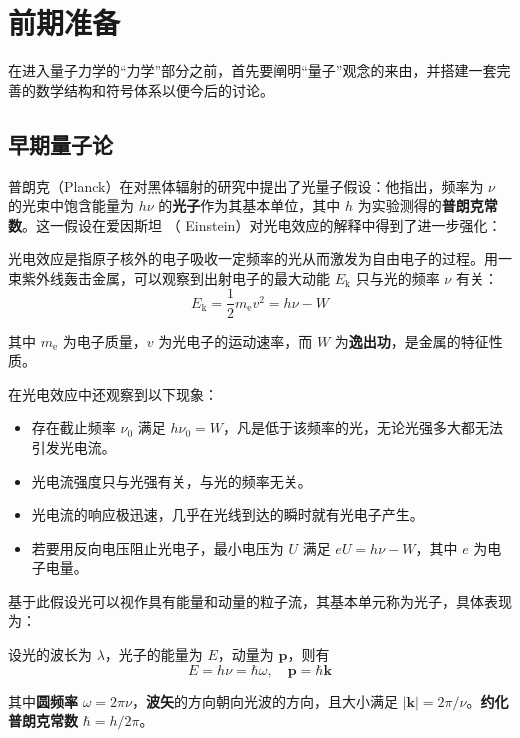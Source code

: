 \documentclass[cn,10pt,math=newtx,citestyle=gb7714-2015,bibstyle=gb7714-2015]{elegantbook}
\def\bm{\boldsymbol}
\def\bf{\textbf}
\def\e{\mathrm e}
\begin{document}
\section{前期准备}

在进入量子力学的“力学”部分之前，首先要阐明“量子”观念的来由，并搭建一套完善的数学结构和符号体系以便今后的讨论。

\subsection{早期量子论}

普朗克（Planck）在对黑体辐射的研究中提出了光量子假设：他指出，频率为 $\nu$ 的光束中饱含能量为 $h\nu$ 的\textbf{光子}作为其基本单位，其中 $h$ 为实验测得的\textbf{普朗克常数}。这一假设在爱因斯坦 （ Einstein）对光电效应的解释中得到了进一步强化：

\begin{definition}[光电效应]\label{def:elecphoto} 

光电效应是指原子核外的电子吸收一定频率的光从而激发为自由电子的过程。用一束紫外线轰击金属，可以观察到出射电子的最大动能 $E_\mathrm{k}$ 只与光的频率 $\nu$ 有关：
\begin{equation}
   \label{a}
   E_\mathrm{k} = \frac 1 2 m_\e v^2 = h\nu - W
\end{equation}

其中 $m_\e$ 为电子质量，$v$ 为光电子的运动速率，而 $W$ 为\textbf{逸出功}，是金属的特征性质。
\end{definition}

在光电效应中还观察到以下现象：

\begin{itemize}
   \item 存在截止频率 $\nu_0$ 满足 $h\nu_0=W$，凡是低于该频率的光，无论光强多大都无法引发光电流。
   \item 光电流强度只与光强有关，与光的频率无关。
   \item 光电流的响应极迅速，几乎在光线到达的瞬时就有光电子产生。
   \item 若要用反向电压阻止光电子，最小电压为 $U$ 满足 $eU=h\nu-W$，其中 $e$ 为电子电量。
\end{itemize}

基于此假设光可以视作具有能量和动量的粒子流，其基本单元称为光子，具体表现为： 
\begin{postulate}[爱因斯坦关系]\label{pos:einstrel} 
设光的波长为 $\lambda$，光子的能量为 $E$，动量为 $\bm p$，则有
\begin{equation}
   E = h\nu = \hbar\omega,\quad \bm p=\hbar\bm k
\end{equation}

其中\textbf{圆频率} $\omega = 2\pi\nu$，\bf{波矢}的方向朝向光波的方向，且大小满足 $|\bm k|=2\pi/\nu$。\bf{约化普朗克常数} $\hbar = h/2\pi$。
\end{postulate}
\end{document}
